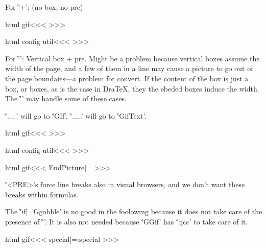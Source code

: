 {{{For \`'\Picture+{}': (no  box, no pre)

\<html gif\><<<
\def\:Gif#1{\cond:pic{%
   \gif:name{#1}\csname a:Picture+\endcsname
   \strt:gf!\img:alt
   \def\EndPicture{\nd:gf!{\c:IMG\Pic:Img}%
      \let\EndPicture|=\:UnDef \csname b:Picture+\endcsname
      \After:Picture}}}
>>>

\<html config util\><<<
>>>








For \`'\Picture*{}': Vertical box + pre. Might be a problem because
vertical boxes assume the width of the page, and a few of them in a
line may cause a picture to go out of the page boundaies---a problem
for convert. If the content of the box is just a box, or boxes, as is
the case in DraTeX, they the ebeded boxes induce the width.
The \`'\hfill\break' may handle some of these cases.

\`'\Picture*{}.....\EndPicture' will go to \''\:GIf'.
\`'\Picture*[..]{}.....\EndPicture' will go to \''\:GifText'.


\<html gif\><<<
\def\:GIf#1{\cond:pic{\ifvmode\vfill\break\else
      \ht:special{t4ht@[}\hfill\break.\ht:special{t4ht@]}\fi 
   \gif:name{#1}\csname a:Picture*\endcsname
   \strt:gf!\img:alt
      \ifmmode \expandafter\vcenter\else \expandafter\vtop\fi
        \bgroup   \let\EndPicture|=\:EndGIf  \NoHtmlEnv }}
\def\:EndGIf{%
        \egroup \nd:gf!{\c:IMG \Pic:Img}\csname b:Picture*\endcsname
        \After:Picture}
>>>

\<html config util\><<<
>>>


\<html gif\><<<
\def\After:Picture{\After:EndPicture
   \global\let\After:EndPicture|=\empty}
\let\After:EndPicture|=\empty
\def\AfterPicture#1{\append:def\After:EndPicture{#1}%
   \global\let\After:EndPicture|=\After:EndPicture}
>>>


\''<PRE>'s force line breaks also in visual browsers, and we don't
want these breaks within formulas.

The \`'\let\:Gif|=\:gobble' is no good in the foolowing because it
does not take care of the presence of \`'\EndPicture'.  It is also not
needed because \''\:Gif' has \''\cond:pic' to take care of it.


\<html gif\><<<
\def\iprt:special{%
   \def\ht:special##1{\tex:special{t4ht+##1}}}
\let\tex:special|=\ht:special 
>>>





}}}
